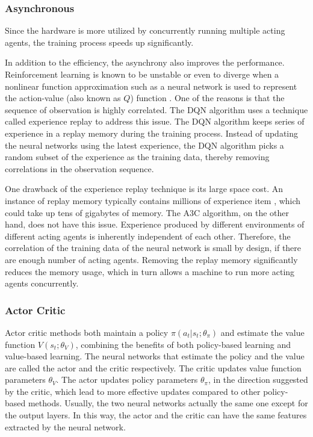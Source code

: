         \subsubsection{Asynchronous}

            Since the hardware is more utilized by concurrently running multiple acting agents,
            the training process speeds up significantly.

            In addition to the efficiency, the asynchrony also improves the performance.
            Reinforcement learning is known to be unstable or even to diverge
            when a nonlinear function approximation such as a neural network is used to represent the action-value
            (also known as $Q$) function \cite{tsitsiklis_analysis_1997}.
            One of the reasons is that the sequence of observation is highly correlated.
            The DQN algorithm uses a technique called experience replay to address this issue.
            The DQN algorithm keeps series of experience in a replay memory during the training process.
            Instead of updating the neural networks using the latest experience,
            the DQN algorithm picks a random subset of the experience as the training data,
            thereby removing correlations in the observation sequence.

            One drawback of the experience replay technique is its large space cost.
            An instance of replay memory typically contains millions of experience item \cite{mnih_human-level_2015},
            which could take up tens of gigabytes of memory.
            The A3C algorithm, on the other hand, does not have this issue.
            Experience produced by different environments of different acting agents
            is inherently independent of each other.
            Therefore, the correlation of the training data of the neural network is small by design,
            if there are enough number of acting agents.
            Removing the replay memory significantly reduces the memory usage,
            which in turn allows a machine to run more acting agents concurrently.

        \subsubsection{Actor Critic}

            Actor critic methods both maintain a policy $\pi(a_t|s_t;\theta_{\pi})$ and 
            estimate the value function $V(s_t;\theta_V)$,
            combining the benefits of both policy-based learning and value-based learning.
            The neural networks that estimate the policy and the value are called the actor and the critic respectively.
            The critic updates value function parameters $\theta_V$.
            The actor updates policy parameters $\theta_{\pi}$, in the direction suggested by the critic,
            which lead to more effective updates compared to other policy-based methods.
            Usually, the two neural networks actually the same one except for the output layers.
            In this way, the actor and the critic can have the same features extracted by the neural network.

